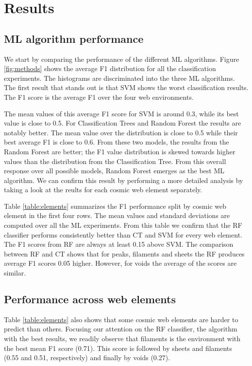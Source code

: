 \documentclass[usenatbib]{mnras}
\begin{document}
\section{Results}\label{sec:results}


\subsection{ML algorithm performance}


We start by comparing the performance of the different ML algorithms.
Figure \ref{fig:methods} shows the average F1 distribution for
all the classification experiments. 
The histograms are discriminated into the three ML algorithms.
The first result that stands out is that SVM shows the worst
classification results.
The F1 score is the average F1 over the four web environments.

The mean values of this average F1 score for SVM is around 0.3, while its best
value is close to 0.5.
For Classification Trees and Random Forest the results are notably better. 
The mean value over the distribution is close to 0.5 while their best
average F1 is close to 0.6.
From these two models, the results from the Random Forest are
better; the F1 value distribution is skewed towards higher values than
the distribution from the Classification Tree.
From this overall response over all possible models, Random Forest
emerges as the best ML algorithm.
We can confirm this result by performing a more detailed analysis by
taking a look at the reults for each cosmic web element separately.


Table \ref{table:elements} summarizes the F1 performance split by cosmic
web element in the first four rows.
The mean values and standard deviations are computed over all the ML
experiments. 
From this table we confirm that the RF classifier performs
consistently better than CT and SVM for every web element.
The F1 scores from RF are always at least 0.15 above SVM.
The comparison between RF and CT shows that for peaks, filaments and
sheets the RF produces average F1 scores 0.05 higher. 
However, for voids the average of the scores are similar. 

\subsection{Performance across web elements}

Table \ref{table:elements} also shows that some cosmic web elements 
are harder to predict than others.
Focusing our attention on the RF classifier, the algorithm with the
best results,  we readily observe that filaments is the environment
with the best mean F1 score (0.71).
This score is followed by sheets and filaments (0.55 and 0.51,
respectively) and finally by voids (0.27). 
\end{document}
